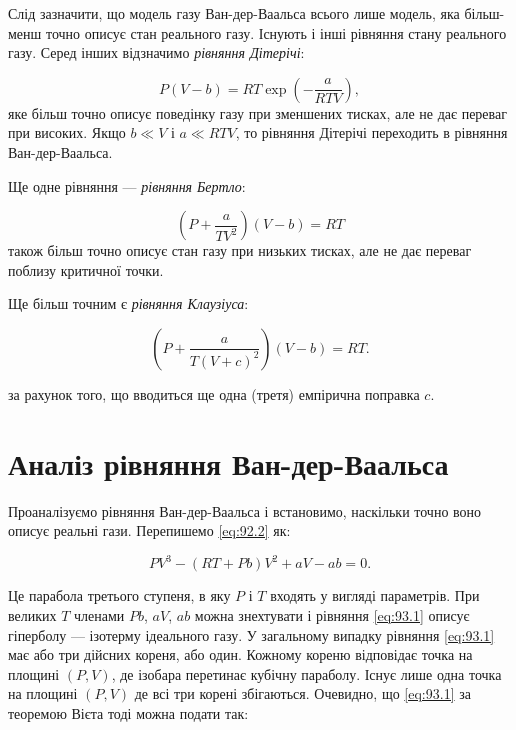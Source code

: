 Слід зазначити, що модель газу Ван-дер-Ваальса всього лише модель, яка більш-менш точно описує стан
реального газу. Існують і інші рівняння стану реального газу. Серед інших відзначимо \emph{рівняння
Дітерічі}:

\begin{equation}
P(V - b) = RT\exp\left( - \frac{a}{RTV} \right),
\label{eq:92.1}
\end{equation}
яке більш точно описує поведінку газу при зменшених тисках, але не дає переваг при високих. Якщо $b
\ll V$ і $a \ll RTV$, то рівняння Дітерічі переходить в рівняння Ван-дер-Ваальса.

Ще одне рівняння --- \emph{рівняння Бертло}:

\begin{equation}
\left( P + \frac{a}{TV^{2}} \right)(V - b) = RT
\label{eq:92.2}
\end{equation}
також більш точно описує стан газу при низьких тисках, але не дає переваг поблизу критичної точки.

Ще більш точним є \emph{рівняння Клаузіуса}:

\begin{equation}
\left( P + \frac{a}{T(V + c)^{2}} \right)(V - b) = RT.
\label{eq:92.3}
\end{equation}

за рахунок того, що вводиться ще одна (третя) емпірична поправка $c$.

\section{Аналіз рівняння Ван-дер-Ваальса}

Проаналізуємо рівняння Ван-дер-Ваальса і встановимо, наскільки точно воно описує реальні гази.
Перепишемо \eqref{eq:92.2} як:

\begin{equation}
PV^{3} - (RT + Pb)V^{2} + aV - ab = 0.
\label{eq:93.1}
\end{equation}

Це парабола третього ступеня, в яку $P$ і $T$ входять у вигляді параметрів. При великих $T$ членами
$Pb$, $aV$, $ab$ можна знехтувати і рівняння \eqref{eq:93.1} описує гіперболу --- ізотерму ідеального газу. У
загальному випадку рівняння \eqref{eq:93.1} має або три дійсних кореня, або один. Кожному кореню відповідає точка
на площині $(P, V)$, де ізобара перетинає кубічну параболу. Існує лише одна точка на площині $(P, V)$
де всі три корені збігаються. Очевидно, що \eqref{eq:93.1} за теоремою Вієта тоді можна подати так:

